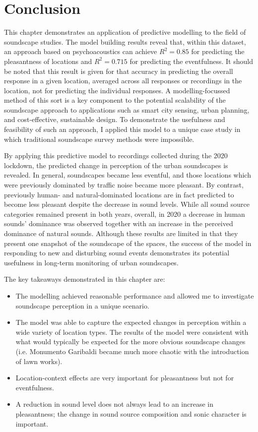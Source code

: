 
\section{Conclusion}

 This chapter demonstrates an application of predictive modelling to the field of soundscape studies. The model building results reveal that, within this dataset, an approach based on psychoacoustics can achieve $R^2=0.85$ for predicting the pleasantness of locations and $R^2=0.715$ for predicting the eventfulness. It should be noted that this result is given for that accuracy in predicting the overall response in a given location, averaged across all responses or recordings in the location, not for predicting the individual responses. A modelling-focussed method of this sort is a key component to the potential scalability of the soundscape approach to applications such as smart city sensing, urban planning, and cost-effective, sustainable design. To demonstrate the usefulness and feasibility of such an approach, I applied this model to a unique case study in which traditional soundscape survey methods were impossible.

 By applying this predictive model to recordings collected during the 2020 lockdown, the predicted change in perception of the urban soundscapes is revealed. In general, soundscapes became less eventful, and those locations which were previously dominated by traffic noise became more pleasant. By contrast, previously human- and natural-dominated locations are in fact predicted to become less pleasant despite the decrease in sound levels. While all sound source categories remained present in both years, overall, in 2020 a decrease in human sounds' dominance was observed together with an increase in the perceived dominance of natural sounds. Although these results are limited in that they present one snapshot of the soundscape of the spaces, the success of the model in responding to new and disturbing sound events demonstrates its potential usefulness in long-term monitoring of urban soundscapes. 

The key takeaways demonstrated in this chapter are:

 \begin{itemize}
  \item The modelling achieved reasonable performance and allowed me to investigate soundscape perception in a unique scenario.
  \item The model was able to capture the expected changes in perception within a wide variety of location types. The results of the model were consistent with what would typically be expected for the more obvious soundscape changes (i.e. Monumento Garibaldi became much more chaotic with the introduction of lawn works).
  \item Location-context effects are very important for pleasantness but not for eventfulness.
  \item A reduction in sound level does not always lead to an increase in pleasantness; the change in sound source composition and sonic character is important.
 \end{itemize}

